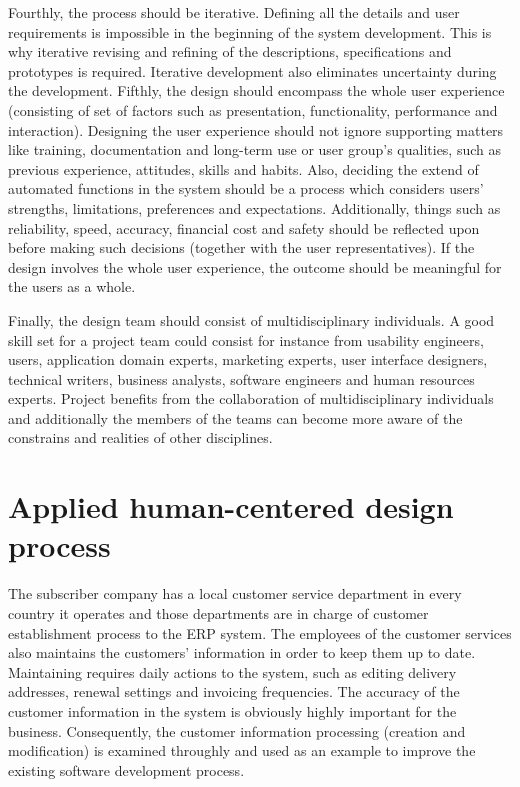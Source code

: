\documentclass[12pt,a4paper,oneside,pdftex]{report}
\begin{document}
Fourthly, the process should be iterative. Defining all the details and user requirements is impossible in the beginning of the system development. This is why iterative revising and refining of the descriptions, specifications and prototypes is required. Iterative development also eliminates uncertainty during the development. Fifthly, the design should encompass the whole user experience (consisting of set of factors such as presentation, functionality, performance and interaction). Designing the user experience should not ignore supporting matters like training, documentation and long-term use or user group's qualities, such as previous experience, attitudes, skills and habits. Also, deciding the extend of automated functions in the system should be a process which considers users' strengths, limitations, preferences and expectations. Additionally, things such as reliability, speed, accuracy, financial cost and safety should be reflected upon before making such decisions (together with the user representatives). If the design involves the whole user experience, the outcome should be meaningful for the users as a whole. \cite{RefWorks:16}

Finally, the design team should consist of multidisciplinary individuals. A good skill set for a project team could consist for instance from usability engineers, users, application domain experts, marketing experts, user interface designers, technical writers, business analysts, software engineers and human resources experts. Project benefits from the collaboration of multidisciplinary individuals and additionally the members of the teams can become more aware of the constrains and realities of other disciplines. \cite{RefWorks:16}

\section{Applied human-centered design process}
\label{sec:dprocess}

The subscriber company has a local customer service department in every country it operates and those departments are in charge of customer establishment process to the ERP system. The employees of the customer services also maintains the customers' information in order to keep them up to date. Maintaining requires daily actions to the system, such as editing delivery addresses, renewal settings and invoicing frequencies. The accuracy of the customer information in the system is obviously highly important for the business. Consequently, the customer information processing (creation and modification) is examined throughly and used as an example to improve the existing software development process.
\end{document}
